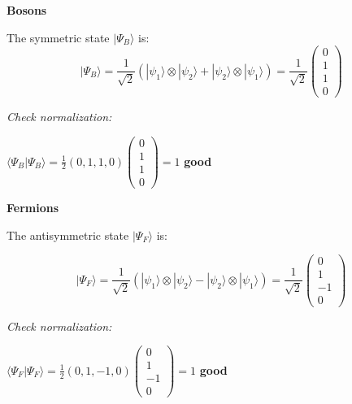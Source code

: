 \documentclass[12pt,a4paper]{report}
\newcommand{\esp}{\vspace{0.5cm}}
\begin{document}
	\esp
	
	\noindent \textbf{Bosons}
	
	\esp
	
	\noindent The symmetric state $|\Psi_B\rangle$ is:
	\begin{equation*}
		|\Psi_B\rangle = \frac{1}{\sqrt{2}} \left( |\psi_1\rangle \otimes |\psi_2\rangle + |\psi_2\rangle \otimes |\psi_1\rangle \right) = \frac{1}{\sqrt{2}} \begin{pmatrix} 0 \\ 1 \\ 1 \\ 0 \end{pmatrix}
	\end{equation*}
	
	\esp
	
	\noindent \textit{Check normalization:}
	
	\esp
	
	$\langle \Psi_B | \Psi_B \rangle = \frac{1}{2} (0, 1, 1, 0) \begin{pmatrix} 0 \\ 1 \\ 1 \\ 0 \end{pmatrix} = 1$ \quad \textbf{good}
	
	\esp
	
	\noindent \textbf{Fermions}
	
	\esp
	
	\noindent The antisymmetric state $|\Psi_F\rangle$ is:
	
	\esp
	
	\begin{equation*}
		|\Psi_F\rangle = \frac{1}{\sqrt{2}} \left( |\psi_1\rangle \otimes |\psi_2\rangle - |\psi_2\rangle \otimes |\psi_1\rangle \right) = \frac{1}{\sqrt{2}} \begin{pmatrix} 0 \\ 1 \\ -1 \\ 0 \end{pmatrix}
	\end{equation*}
	
	\esp
	
	\noindent \textit{Check normalization:}
	
	\esp
	
	$\langle \Psi_F | \Psi_F \rangle = \frac{1}{2} (0, 1, -1, 0) \begin{pmatrix} 0 \\ 1 \\ -1 \\ 0 \end{pmatrix} = 1$ \quad \textbf{good}
	
\end{document}
